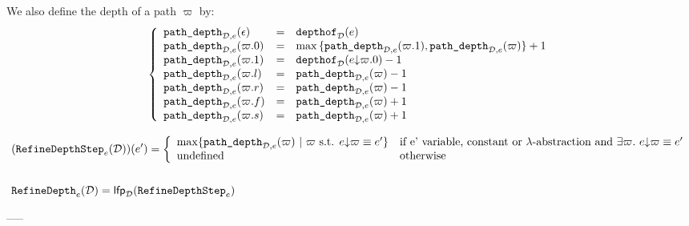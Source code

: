 \documentclass[a4paper]{article}
\theoremstyle{definition}
\begin{document}
    We also define the depth of a path $\varpi$ by:
    \[
      \left\{
        \begin{array}{lcl}
          \texttt{path\_depth}_{\mathcal{D},e}(\epsilon) & = & \texttt{depthof}_{\mathcal{D}}(e)\\
          \texttt{path\_depth}_{\mathcal{D},e}(\varpi.0) & = & \max {\{\texttt{path\_depth}_{\mathcal{D},e}(\varpi.1),\texttt{path\_depth}_{\mathcal{D},e}(\varpi)\}}+1\\
          \texttt{path\_depth}_{\mathcal{D},e}(\varpi.1) & = & \texttt{depthof}_{\mathcal{D}}(e{\downarrow}\varpi.0)-1\\
          \texttt{path\_depth}_{\mathcal{D},e}(\varpi.l) & = & \texttt{path\_depth}_{\mathcal{D},e}(\varpi)-1\\
          \texttt{path\_depth}_{\mathcal{D},e}(\varpi.r) & = & \texttt{path\_depth}_{\mathcal{D},e}(\varpi)-1\\
          \texttt{path\_depth}_{\mathcal{D},e}(\varpi.f) & = & \texttt{path\_depth}_{\mathcal{D},e}(\varpi)+1\\
          \texttt{path\_depth}_{\mathcal{D},e}(\varpi.s) & = & \texttt{path\_depth}_{\mathcal{D},e}(\varpi)+1
        \end{array}  
      \right.
    \]

    \begin{align*}
      &(\texttt{RefineDepthStep}_{e} (\mathcal{D}))(e') = 
        \left\{\begin{array}{ll}
          \max \{\texttt{path\_depth}_{\mathcal{D},e}(\varpi) ~|~ \varpi \text{ s.t. } e{\downarrow}\varpi \equiv e'\} & \text{if e' variable, constant or $\lambda$-abstraction and } \exists \varpi.\ e{\downarrow}\varpi \equiv e'\\
          \text{undefined} & \text{otherwise}
        \end{array}\right.\\&\\
      &\texttt{RefineDepth}_{e}(\mathcal{D})=\textsf{lfp}_{\mathcal{D}} (\texttt{RefineDepthStep}_{e})
    \end{align*}

    -----
\end{document}
